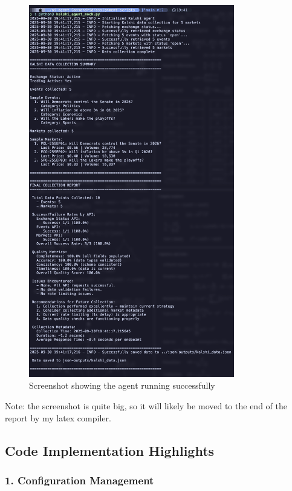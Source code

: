 \documentclass[12pt,a4paper]{article}
\begin{document}
\begin{figure}[h]
  \centering
  \includegraphics[width=0.8\textwidth]{media/agent-running.png}
  \caption{Screenshot showing the agent running successfully}
  \label{fig:agent_running}
\end{figure}

Note: the screenshot is quite big, so it will likely be moved to the end of the report by my latex compiler.

\subsection{Code Implementation Highlights}

\subsubsection{1. Configuration Management}
\end{document}

